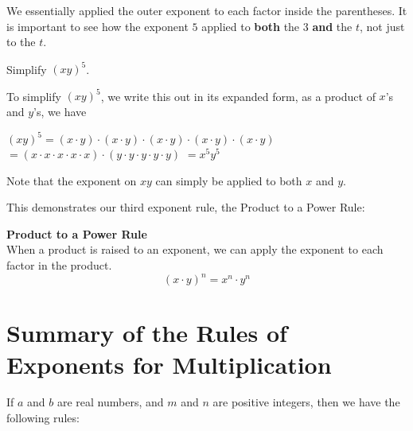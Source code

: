 \documentclass{ximera}
\begin{document}
        We essentially applied the outer exponent to each factor inside the parentheses.
        It is important to see how the exponent $5$ applied to \textbf{both} the $3$ \textbf{and} the $t$,
        not just to the $t$.
   

 \begin{example}   
          Simplify $(xy)^5$.
    
          To simplify $(xy)^5$,
          we write this out in its expanded form,
          as a product of $x$'s and $y$'s, we have

            $(xy)^5 =(x \cdot y) \cdot (x \cdot y) \cdot (x \cdot y) \cdot (x \cdot y) \cdot (x \cdot y)$
            $=(x \cdot x \cdot x \cdot x \cdot x) \cdot (y \cdot y \cdot y \cdot y \cdot y)$
            $=x^5 y^5$

          Note that the exponent on $xy$ can simply be applied to both $x$ and $y$.
\end{example}


      This demonstrates our third exponent rule,
      the Product to a Power Rule:
\begin{callout}
\textbf{ \Large Product to a Power Rule} \\
      When a product is raised to an exponent,
      we can apply the exponent to each factor in the product.
\[
        \left(x\cdot y\right)^n = x^{n}\cdot y^{n}
 \]
\end{callout}


      \section{Summary of the Rules of Exponents for Multiplication}
  


          If $a$ and $b$ are real numbers,
          and $m$ and $n$ are positive integers,
          then we have the following rules:
 
\end{document}
